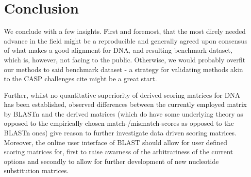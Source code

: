 \documentclass{article}
\begin{document}
\section*{Conclusion}
We conclude with a few insights. First and foremost, that the most direly
needed advance in the field might be a reproducible and generally agreed upon
consensus of what makes a good alignment for DNA, and resulting benchmark
dataset, which is, however, not facing to the public. Otherwise, we would
probably overfit our methods to said benchmark dataset - a strategy for
validating methods akin to the CASP challenges cite might be a great start.

Further, whilst no quantitative superiority of derived scoring matrices for DNA
has been established, observed differences between the currently employed matrix by BLASTn and the derived matrices (which do have some underlying theory as
opposed to the empirically chosen match-/mismatch-scores as opposed to the BLASTn ones) give reason to further investigate data driven scoring matrices. Moreover, the online user interface of BLAST should allow for user defined scoring matrices for, first to raise awarness of the arbitrariness of the current options and secondly to allow for further development of new nucleotide substitution matrices.

\pagebreak
\printbibliography
\end{document}
